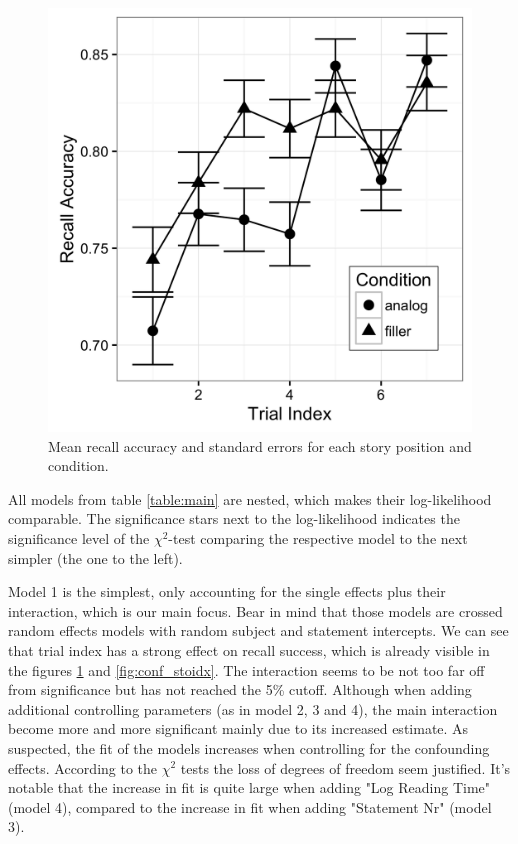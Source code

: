 \documentclass[a4paper,man,natbib,floatsintext,import]{apa6}
\begin{document}
\begin{figure}
\centering
\begin{minipage}[t]{.5\textwidth}
\includegraphics[width=.9\linewidth]{figures/main.png}
\caption{Mean recall accuracy and standard errors for each story position and condition.}
\label{fig:main}
\end{minipage}
\end{figure}

All models from table \ref{table:main} are nested, which makes their log-likelihood comparable. The significance stars next to the log-likelihood indicates the significance level of the ${\chi}^2$-test comparing the respective model to the next simpler (the one to the left).

Model 1 is the simplest, only accounting for the single effects plus their interaction, which is our main focus. Bear in mind that those models are crossed random effects models with random subject and statement intercepts. We can see that trial index has a strong effect on recall success, which is already visible in the figures \ref{fig:main} and \ref{fig:conf_stoidx}. The interaction seems to be not too far off from significance but has not reached the 5\% cutoff. Although when adding additional controlling parameters (as in model 2, 3 and 4), the main interaction become more and more significant mainly due to its increased estimate. As suspected, the fit of the models increases when controlling for the confounding effects. According to the ${\chi}^2$ tests the loss of degrees of freedom seem justified. It's notable that the increase in fit is quite large when adding "Log Reading Time" (model 4), compared to the increase in fit when adding "Statement Nr" (model 3).
\end{document}
